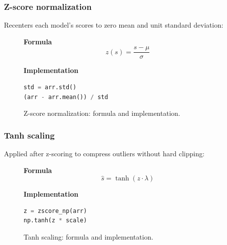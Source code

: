 \documentclass[11pt, letterpaper]{article}
\begin{document}
\subsubsection{Z-score normalization}

Recenters each model's scores to zero mean and unit standard deviation:

\begin{figure}[H]
  \centering
  \begin{minipage}[t]{0.45\textwidth}
    \vspace{0pt}
    \textbf{Formula}
    \[
      z(s) = \frac{s - \mu}{\sigma}
    \]
  \end{minipage}
  \hfill
  \begin{minipage}[t]{0.50\textwidth}
    \vspace{0pt}
    \textbf{Implementation}
\begin{lstlisting}[language=Python]
std = arr.std()
(arr - arr.mean()) / std
\end{lstlisting}

  \end{minipage}
  \caption{Z-score normalization: formula and implementation.}
  \label{fig:z_score}
\end{figure}


\subsubsection{Tanh scaling}

Applied after z-scoring to compress outliers without hard clipping:

\begin{figure}[H]
  \centering
  \begin{minipage}[t]{0.45\textwidth}
    \vspace{0pt}
    \textbf{Formula}
    \[
      \hat{s} = \tanh(z \cdot \lambda)
    \]
  \end{minipage}
  \hfill
  \begin{minipage}[t]{0.50\textwidth}
    \vspace{0pt}
    \textbf{Implementation}
\begin{lstlisting}[language=Python]
z = zscore_np(arr)
np.tanh(z * scale)
\end{lstlisting}

  \end{minipage}
  \caption{Tanh scaling: formula and implementation.}
  \label{fig:tanh}
\end{figure}
\end{document}
